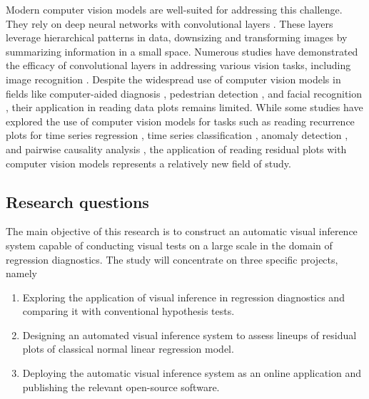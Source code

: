 \documentclass[11pt,a4paper,]{article}
\providecommand{\tightlist}{%
  \setlength{\itemsep}{0pt}\setlength{\parskip}{0pt}}
\begin{document}
Modern computer vision models are well-suited for addressing this challenge. They rely on deep neural networks with convolutional layers \autocite{fukushima_neocognitron_1982}. These layers leverage hierarchical patterns in data, downsizing and transforming images by summarizing information in a small space. Numerous studies have demonstrated the efficacy of convolutional layers in addressing various vision tasks, including image recognition \autocite{rawat_deep_2017}. Despite the widespread use of computer vision models in fields like computer-aided diagnosis \autocite{lee_image_2015}, pedestrian detection \autocite{brunetti_computer_2018}, and facial recognition \autocite{emami_facial_2012}, their application in reading data plots remains limited. While some studies have explored the use of computer vision models for tasks such as reading recurrence plots for time series regression \autocite{ojeda_multivariate_2020}, time series classification \autocite{chu_automatic_2019,hailesilassie_financial_2019,hatami_classification_2018,zhang_encoding_2020}, anomaly detection \autocite{chen_convolutional_2020}, and pairwise causality analysis \autocite{singh_deep_2017}, the application of reading residual plots with computer vision models represents a relatively new field of study.

\hypertarget{research-questions}{%
\subsection{Research questions}\label{research-questions}}

The main objective of this research is to construct an automatic visual inference system capable of conducting visual tests on a large scale in the domain of regression diagnostics. The study will concentrate on three specific projects, namely

\begin{enumerate}
\def\labelenumi{\arabic{enumi}.}
\tightlist
\item
  Exploring the application of visual inference in regression diagnostics and comparing it with conventional hypothesis tests.
\item
  Designing an automated visual inference system to assess lineups of residual plots of classical normal linear regression model.
\item
  Deploying the automatic visual inference system as an online application and publishing the relevant open-source software.
\end{enumerate}
\end{document}
